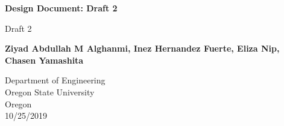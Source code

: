 \begin{titlepage}
    \begin{center}
        \vspace*{1cm}
 
        \Huge
        \textbf{Design Document: Draft 2}
 
        \vspace{0.5cm}
        \LARGE
        Draft 2
 
        \vspace{1.5cm}
 
        \textbf{Ziyad Abdullah M Alghanmi, Inez Hernandez Fuerte, Eliza Nip, Chasen Yamashita}
 
        \vfill
 
        \vspace{0.8cm}
 
        \Large
        Department of Engineering\\
        Oregon State University\\
        Oregon\\
        10/25/2019\\
 
    \end{center}
\end{titlepage}